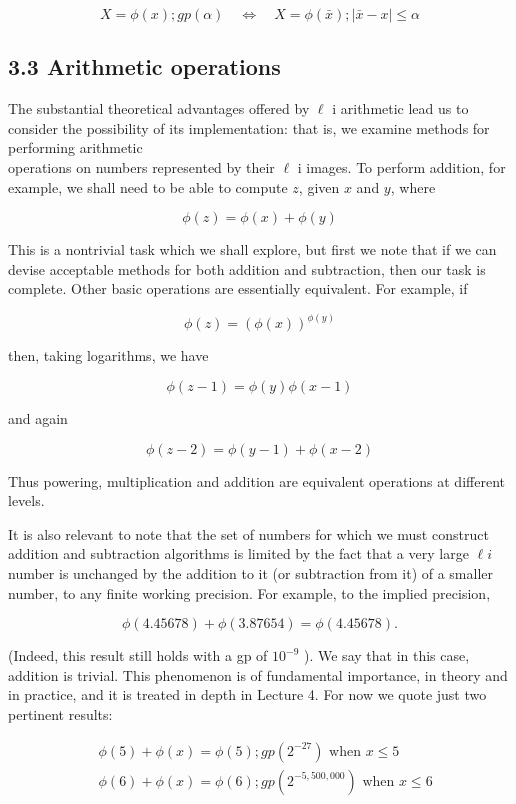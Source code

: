 \documentclass[10pt]{article}
\begin{document}
$$
X=\phi(x) ; g p(\alpha) \quad \Leftrightarrow \quad X=\phi(\bar{x}) ;|\bar{x}-x| \leqslant \alpha
$$

\subsection*{3.3 Arithmetic operations}
The substantial theoretical advantages offered by $\ell$ i arithmetic lead us to consider the possibility of its implementation: that is, we examine methods for performing arithmetic\\
operations on numbers represented by their $\ell$ i images. To perform addition, for example, we shall need to be able to compute $z$, given $x$ and $y$, where

$$
\phi(z)=\phi(x)+\phi(y)
$$

This is a nontrivial task which we shall explore, but first we note that if we can devise acceptable methods for both addition and subtraction, then our task is complete. Other basic operations are essentially equivalent. For example, if

$$
\phi(z)=(\phi(x))^{\phi(y)}
$$

then, taking logarithms, we have

$$
\phi(z-1)=\phi(y) \phi(x-1)
$$

and again

$$
\phi(z-2)=\phi(y-1)+\phi(x-2)
$$

Thus powering, multiplication and addition are equivalent operations at different levels.

It is also relevant to note that the set of numbers for which we must construct addition and subtraction algorithms is limited by the fact that a very large $\ell i$ number is unchanged by the addition to it (or subtraction from it) of a smaller number, to any finite working precision. For example, to the implied precision,

$$
\phi(4.45678)+\phi(3.87654)=\phi(4.45678) .
$$

(Indeed, this result still holds with a gp of $10^{-9}$ ). We say that in this case, addition is trivial. This phenomenon is of fundamental importance, in theory and in practice, and it is treated in depth in Lecture 4. For now we quote just two pertinent results:

$$
\begin{aligned}
& \phi(5)+\phi(x)=\phi(5) ; g p\left(2^{-27}\right) \text { when } x \leqslant 5 \\
& \phi(6)+\phi(x)=\phi(6) ; g p\left(2^{-5,500,000}\right) \text { when } x \leqslant 6
\end{aligned}
$$
\end{document}
